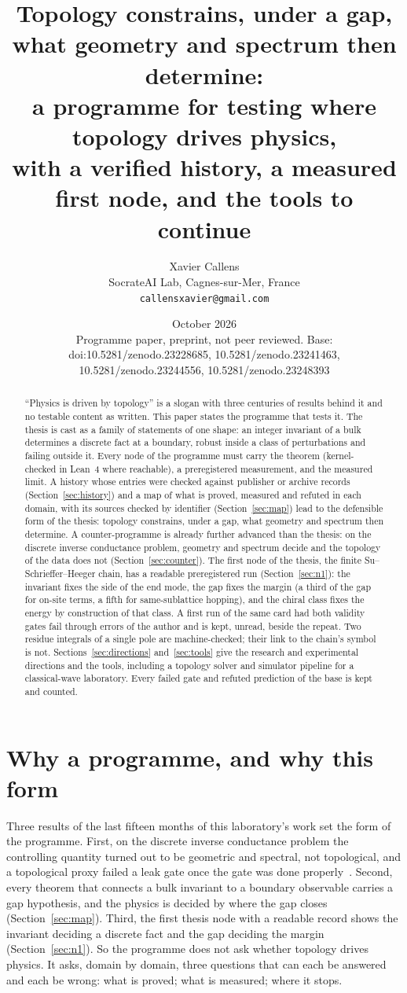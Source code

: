 \documentclass[11pt,a4paper]{article}
\title{Topology constrains, under a gap, what geometry and spectrum then determine:\\ a programme for testing where topology drives physics,\\ with a verified history, a measured first node, and the tools to continue}
\author{Xavier Callens\\[2pt]
\small SocrateAI Lab, Cagnes-sur-Mer, France\\
\small \texttt{callensxavier@gmail.com}}
\date{October 2026 \\ \small Programme paper, preprint, not peer reviewed. Base: doi:10.5281/zenodo.23228685, 10.5281/zenodo.23241463, 10.5281/zenodo.23244556, 10.5281/zenodo.23248393}
\begin{document}
\maketitle

\begin{abstract}
``Physics is driven by topology'' is a slogan with three centuries of results behind it and no testable content as written. This paper states the programme that tests it. The thesis is cast as a family of statements of one shape: an integer invariant of a bulk determines a discrete fact at a boundary, robust inside a class of perturbations and failing outside it. Every node of the programme must carry the theorem (kernel-checked in Lean~4 where reachable), a preregistered measurement, and the measured limit. A history whose entries were checked against publisher or archive records (Section~\ref{sec:history}) and a map of what is proved, measured and refuted in each domain, with its sources checked by identifier (Section~\ref{sec:map}) lead to the defensible form of the thesis: topology constrains, under a gap, what geometry and spectrum then determine. A counter-programme is already further advanced than the thesis: on the discrete inverse conductance problem, geometry and spectrum decide and the topology of the data does not (Section~\ref{sec:counter}). The first node of the thesis, the finite Su--Schrieffer--Heeger chain, has a readable preregistered run (Section~\ref{sec:n1}): the invariant fixes the side of the end mode, the gap fixes the margin (a third of the gap for on-site terms, a fifth for same-sublattice hopping), and the chiral class fixes the energy by construction of that class. A first run of the same card had both validity gates fail through errors of the author and is kept, unread, beside the repeat. Two residue integrals of a single pole are machine-checked; their link to the chain's symbol is not. Sections~\ref{sec:directions} and~\ref{sec:tools} give the research and experimental directions and the tools, including a topology solver and simulator pipeline for a classical-wave laboratory. Every failed gate and refuted prediction of the base is kept and counted.
\end{abstract}

\section{Why a programme, and why this form}
Three results of the last fifteen months of this laboratory's work set the form of the programme. First, on the discrete inverse conductance problem the controlling quantity turned out to be geometric and spectral, not topological, and a topological proxy failed a leak gate once the gate was done properly~\cite{Paper2,Paper3}. Second, every theorem that connects a bulk invariant to a boundary observable carries a gap hypothesis, and the physics is decided by where the gap closes (Section~\ref{sec:map}). Third, the first thesis node with a readable record shows the invariant deciding a discrete fact and the gap deciding the margin (Section~\ref{sec:n1}).
So the programme does not ask whether topology drives physics. It asks, domain by domain, three questions that can each be answered and each be wrong: what is proved; what is measured; where it stops.
\end{document}

